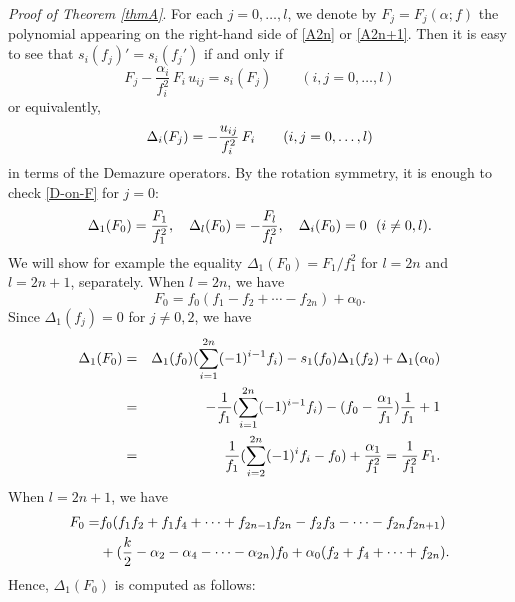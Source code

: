 \medskip\noindent
{\em Proof of Theorem \ref{thmA}}.
For each $j=0,\ldots,l$, we denote by $F_j=F_j(\alpha;f)$ the polynomial 
appearing on the right-hand side of \eqref{A2n} or \eqref{A2n+1}.
Then it is easy to see that $s_i(f_j)'=s_i(f_j')$ if and only if 
\begin{equation}
F_j-\frac{\alpha_i}{f_i^2}\,F_i \,  u_{ij}=s_i(F_j)\qquad(i,j=0,\ldots,l)
\end{equation}
or equivalently, 
\begin{equation}\Label{D-on-F}
\Delta_i(F_j)=-\frac{u_{ij}}{f_i^2} \, F_i\qquad(i,j=0,\ldots,l)
\end{equation}
in terms of the Demazure operators. 
By the rotation symmetry, it is enough to check \eqref{D-on-F} for $j=0$:
\begin{equation}\Label{tochk}
\Delta_{1}(F_0)=\frac{F_1}{f_1^2}, \quad\Delta_{l}(F_0)=-\frac{F_l}{f_l^2},
\quad \Delta_i(F_0)=0\ \ (i\ne 0,l). 
\end{equation}
We will show for example the equality $\Delta_{1}(F_0)=F_1/f_1^2$ for 
$l=2n$ and $l=2n+1$, separately. 
When $l=2n$, we have
\begin{equation}
F_0=f_0(f_1-f_2+\cdots-f_{2n})+\alpha_0. 
\end{equation}
Since $\Delta_1(f_j)=0$ for $j\ne 0,2$, we have
\begin{eqnarray}
\Delta_1(F_0)&=&\Delta_1(f_0)(\sum_{i=1}^{2n}(-1)^{i-1} f_i) 
-s_1(f_0)\Delta_1(f_2)+\Delta_1(\alpha_0)\\
&=&-\frac{1}{f_1}(\sum_{i=1}^{2n}(-1)^{i-1} f_i)
-(f_0-\frac{\alpha_1}{f_1})\frac{1}{f_1}+1
\notag\\
&=&\frac{1}{f_1}(\sum_{i=2}^{2n}(-1)^{i} f_i -f_0)+\frac{\alpha_1}{f_1^2}
=\frac{1}{f_1^2}\, F_1. 
\notag
\end{eqnarray}
When $l=2n+1$, we have 
\begin{equation}
\begin{align}
F_0=&f_0(f_1f_2+f_1f_4+\cdots+f_{2n-1}f_{2n}-
f_2f_3-\cdots-f_{2n}f_{2n+1})\\
&
+(\frac{k}{2}-\alpha_2-\alpha_4-\cdots-\alpha_{2n})f_0+\alpha_0(f_2+f_4+\cdots+f_{2n}).
\notag
\end{align}
\end{equation}
Hence, $\Delta_1(F_0)$ is computed as follows:
\allowdisplaybreaks

